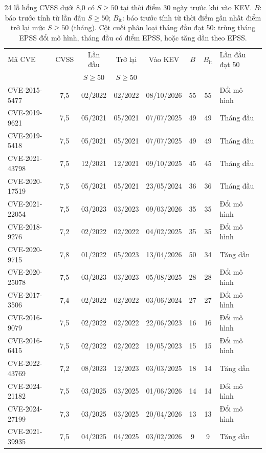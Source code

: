 \documentclass[runningheads]{llncs}
\begin{document}
\begin{table}
\centering
\caption{24 lỗ hổng CVSS dưới 8,0 có $S \ge 50$ tại thời điểm 30 ngày trước khi vào KEV. $B$: báo trước tính
từ lần đầu $S \ge 50$; $B_{\text{lt}}$: báo trước tính từ thời điểm gần nhất điểm trở lại mức $S \ge 50$
(tháng). Cột cuối phân loại tháng đầu đạt 50: trùng tháng EPSS đổi mô hình, tháng đầu có điểm
EPSS, hoặc tăng dần theo EPSS.}\label{tab:baotruoc}
\footnotesize
\begin{tabular}{lccccccl}
\toprule
Mã CVE & CVSS & Lần đầu & Trở lại & Vào KEV & $B$ & $B_{\text{lt}}$ & Lần đầu đạt 50 \\
 & & $S \ge 50$ & $S \ge 50$ & & & & \\
\midrule
CVE-2015-5477 & 7,5 & 02/2022 & 02/2022 & 08/10/2026 & 55 & 55 & Đổi mô hình \\
CVE-2019-9621 & 7,5 & 05/2021 & 05/2021 & 07/07/2025 & 49 & 49 & Tháng đầu \\
CVE-2019-5418 & 7,5 & 05/2021 & 05/2021 & 07/07/2025 & 49 & 49 & Tháng đầu \\
CVE-2021-43798 & 7,5 & 12/2021 & 12/2021 & 09/10/2025 & 45 & 45 & Tháng đầu \\
CVE-2020-17519 & 7,5 & 05/2021 & 05/2021 & 23/05/2024 & 36 & 36 & Tháng đầu \\
CVE-2021-22054 & 7,5 & 03/2023 & 03/2023 & 09/03/2026 & 35 & 35 & Đổi mô hình \\
CVE-2018-9276 & 7,2 & 02/2022 & 02/2022 & 04/02/2025 & 35 & 35 & Đổi mô hình \\
CVE-2020-9715 & 7,8 & 01/2022 & 05/2023 & 13/04/2026 & 50 & 34 & Tăng dần \\
CVE-2020-25078 & 7,5 & 03/2023 & 03/2023 & 05/08/2025 & 28 & 28 & Đổi mô hình \\
CVE-2017-3506 & 7,4 & 02/2022 & 02/2022 & 03/06/2024 & 27 & 27 & Đổi mô hình \\
CVE-2016-9079 & 7,5 & 02/2022 & 02/2022 & 22/06/2023 & 16 & 16 & Đổi mô hình \\
CVE-2016-6415 & 7,5 & 02/2022 & 02/2022 & 19/05/2023 & 15 & 15 & Đổi mô hình \\
CVE-2022-43769 & 7,2 & 08/2023 & 12/2023 & 03/03/2025 & 18 & 14 & Tăng dần \\
CVE-2024-21182 & 7,5 & 03/2025 & 03/2025 & 01/06/2026 & 14 & 14 & Đổi mô hình \\
CVE-2024-27199 & 7,3 & 03/2025 & 03/2025 & 20/04/2026 & 13 & 13 & Đổi mô hình \\
CVE-2021-39935 & 7,5 & 04/2025 & 04/2025 & 03/02/2026 & 9 & 9 & Tăng dần \\

\end{tabular}
\end{table}
\end{document}
